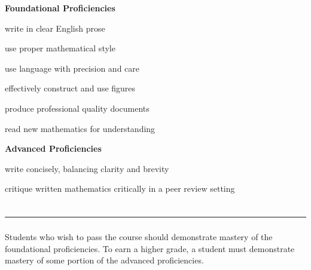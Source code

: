 \documentclass[11pt]{amsart}
\begin{document}
\textbf{Foundational Proficiencies}
\begin{compactitem}
\item write in clear English prose
\item use proper mathematical style
\item use language with precision and care
\item effectively construct and use figures
\item produce professional quality documents
\item read new mathematics for understanding
\end{compactitem}

\textbf{Advanced Proficiencies}
\begin{compactitem}
\item write concisely, balancing clarity and brevity
\item critique written mathematics critically in a peer review setting
\end{compactitem}

$\phantom{space}$\\
\hrule
$\phantom{space}$\\

Students who wish to pass the course should demonstrate mastery of the
foundational proficiencies. To earn a higher grade, a student must demonstrate
mastery of some portion of the advanced proficiencies.
\end{document}

